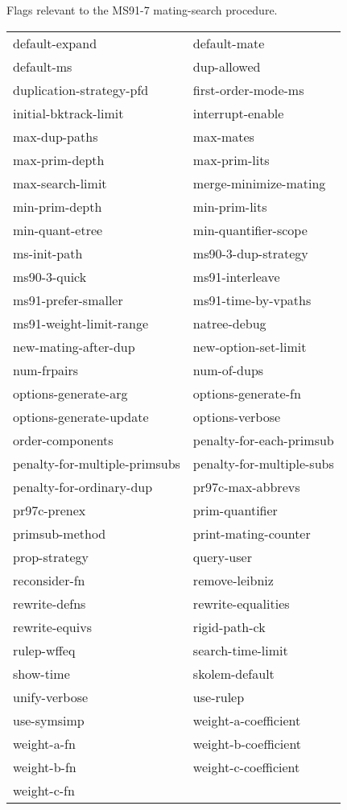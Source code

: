 \begin{description}
\item[MS91-7]  
Flags relevant to the MS91-7 mating-search procedure.

\begin{tabular}{l l}
default-expand&default-mate\\
default-ms&dup-allowed\\
duplication-strategy-pfd&first-order-mode-ms\\
initial-bktrack-limit&interrupt-enable\\
max-dup-paths&max-mates\\
max-prim-depth&max-prim-lits\\
max-search-limit&merge-minimize-mating\\
min-prim-depth&min-prim-lits\\
min-quant-etree&min-quantifier-scope\\
ms-init-path&ms90-3-dup-strategy\\
ms90-3-quick&ms91-interleave\\
ms91-prefer-smaller&ms91-time-by-vpaths\\
ms91-weight-limit-range&natree-debug\\
new-mating-after-dup&new-option-set-limit\\
num-frpairs&num-of-dups\\
options-generate-arg&options-generate-fn\\
options-generate-update&options-verbose\\
order-components&penalty-for-each-primsub\\
penalty-for-multiple-primsubs&penalty-for-multiple-subs\\
penalty-for-ordinary-dup&pr97c-max-abbrevs\\
pr97c-prenex&prim-quantifier\\
primsub-method&print-mating-counter\\
prop-strategy&query-user\\
reconsider-fn&remove-leibniz\\
rewrite-defns&rewrite-equalities\\
rewrite-equivs&rigid-path-ck\\
rulep-wffeq&search-time-limit\\
show-time&skolem-default\\
unify-verbose&use-rulep\\
use-symsimp&weight-a-coefficient\\
weight-a-fn&weight-b-coefficient\\
weight-b-fn&weight-c-coefficient\\
weight-c-fn
\end{tabular}
\item
\end{description}

